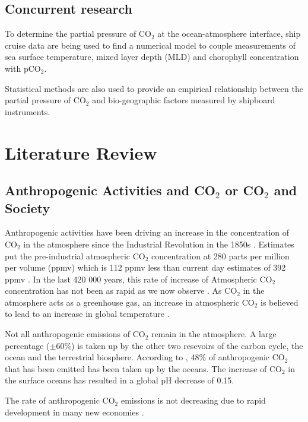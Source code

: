 \documentclass[11pt, a4paper]{article}
\numberwithin{figure}{section}
\numberwithin{table}{section}
\begin{document}
\subsection{Concurrent research}
To determine the partial pressure of CO${_2}$ at the ocean-atmosphere 
interface, ship cruise data are being used to find a numerical model to
couple measurements of sea surface temperature, mixed layer depth (MLD)
and chorophyll concentration with pCO${_2}$.

Statistical methods are also used to provide an empirical relationship 
between the partial pressure of CO${_2}$ and bio-geographic factors 
measured by shipboard instruments.

\newpage
\section{Literature Review}
\subsection{Anthropogenic Activities and CO$_2$ or CO$_2$ and Society}
Anthropogenic activities have been driving an increase in the concentration of 
CO$_2$ in the atmosphere since the Industrial Revolution in the 1850s 
\citep{keelingandwhorf2003}.%
Estimates put the pre-industrial atmospheric CO$_2$ 
concentration at 280 parts per million per volume (ppmv) which is 112 ppmv less 
than current day estimates of 392 ppmv 
\citep{tans2011trends}.%
In the last 420 000 years, this rate of increase of Atmospheric CO$_2$ concentration 
has not been as rapid as we now observe 
\citep{falkowski2000}.%
As CO$_2$ in the atmosphere acts as a greenhouse gas, 
an increase in atmospheric CO$_2$ is believed to lead to an increase in global 
temperature 
\citep{Schimel2001}.%

Not all anthropogenic emissions of CO$_2$ remain in the atmosphere. 
A large percentage ($\pm60\%$) is taken up by the 
other two resevoirs of the carbon cycle, the ocean and the terrestrial 
biosphere. 
According to 
\citet{Sabine2004},%
48\% of anthropogenic CO$_2$ that has been emitted has been taken up by the oceans. 
The increase of CO$_2$ in the surface oceans has resulted in a global pH decrease of 0.15. 

The rate of anthropogenic CO$_2$ emissions is not decreasing due to rapid 
development in many new economies 
\citep{}.%
\end{document}
